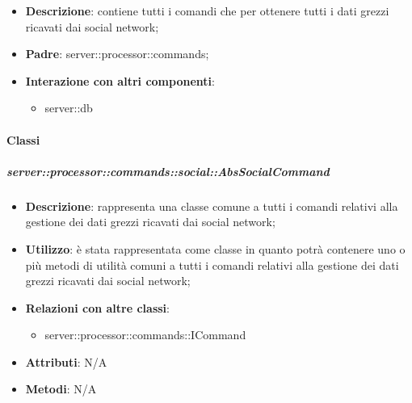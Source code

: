       \begin{itemize}
        \item \textbf{Descrizione}: contiene tutti i comandi che per ottenere tutti i dati grezzi ricavati dai social network;
        \item \textbf{Padre}: server::processor::commands;
        \item \textbf{Interazione con altri componenti}:
          \begin{itemize}
            \item server::db
          \end{itemize}
      \end{itemize}

        \paragraph{Classi} %

        \subparagraph{server::processor::commands::social::AbsSocialCommand} %
        \label{subp:bdsm_app_server_processor_commands_social_abssocialcommand}
        \begin{itemize}
          \item \textbf{Descrizione}: rappresenta una classe comune a tutti i comandi relativi alla gestione dei dati grezzi ricavati dai social network;
          \item \textbf{Utilizzo}: è stata rappresentata come classe in quanto potrà contenere uno o più metodi di utilità comuni a tutti i comandi relativi alla gestione dei dati grezzi ricavati dai social network;
          \item \textbf{Relazioni con altre classi}:
            \begin{itemize}
              \item server::processor::commands::ICommand
            \end{itemize}
			\item \textbf{Attributi}: N/A
			\item \textbf{Metodi}: N/A
        \end{itemize}


